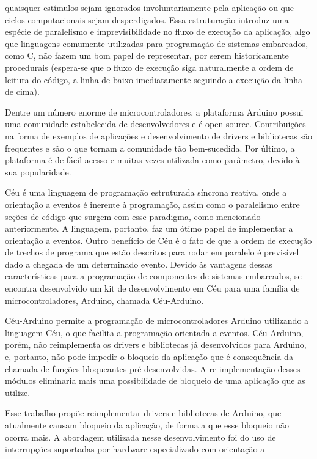 \documentclass[11pt]{article}
\begin{document}
quaisquer estímulos sejam ignorados involuntariamente pela aplicação ou que ciclos computacionais
sejam desperdiçados. Essa estruturação introduz uma espécie de paralelismo e imprevisibilidade no
fluxo de execução da aplicação, algo que linguagens comumente utilizadas para programação de
sistemas embarcados, como C, não fazem um bom papel de representar, por serem historicamente
procedurais (espera-se que o fluxo de execução siga naturalmente a ordem de leitura do código, a
linha de baixo imediatamente seguindo a execução da linha de cima).
\par Dentre um número enorme de microcontroladores, a plataforma Arduino possui uma comunidade estabelecida de desenvolvedores e é open-source. Contribuições na forma de
exemplos de aplicações e desenvolvimento de drivers e bibliotecas são frequentes e são o que tornam
a comunidade tão bem-sucedida. Por último, a plataforma é de fácil acesso e muitas vezes utilizada
como parâmetro, devido à sua popularidade. \cite{arduinoblog}
\par Céu é uma linguagem de programação estruturada síncrona reativa, onde a orientação a eventos é
inerente à programação, assim como o paralelismo entre seções de código que surgem com esse
paradigma, como mencionado anteriormente. A linguagem, portanto, faz um ótimo papel de
implementar a orientação a eventos. Outro benefício de Céu é o fato de que a ordem de execução de
trechos de programa que estão descritos para rodar em paralelo é previsível dado a chegada de um
determinado evento. \cite{santanna2012} Devido às vantagens dessas características para a programação de
componentes de sistemas embarcados, se encontra desenvolvido um kit de desenvolvimento em Céu para
uma família de microcontroladores, Arduino, chamada Céu-Arduino.
\par Céu-Arduino permite a programação de microcontroladores Arduino utilizando a linguagem Céu, o
que facilita a programação orientada a eventos. Céu-Arduino, porém, não reimplementa os drivers e
bibliotecas já desenvolvidos para Arduino, e, portanto, não pode impedir o
bloqueio da aplicação que é consequência da chamada de funções bloqueantes pré-desenvolvidas. A
re-implementação desses módulos eliminaria mais uma possibilidade de bloqueio de uma aplicação
que as utilize. \cite{githubceuarduino}
\par Esse trabalho propõe reimplementar drivers e bibliotecas de Arduino, que atualmente causam
bloqueio da aplicação, de forma a que esse bloqueio não ocorra mais. A abordagem utilizada nesse
desenvolvimento foi do uso de interrupções suportadas por hardware especializado com orientação a
\end{document}

